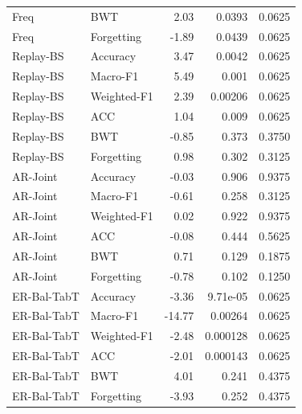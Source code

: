 \begin{table}[t]
\begin{tabular}{llrrr}
Freq & BWT & 2.03 & 0.0393 & 0.0625 \\
Freq & Forgetting & -1.89 & 0.0439 & 0.0625 \\
Replay-BS & Accuracy & 3.47 & 0.0042 & 0.0625 \\
Replay-BS & Macro-F1 & 5.49 & 0.001 & 0.0625 \\
Replay-BS & Weighted-F1 & 2.39 & 0.00206 & 0.0625 \\
Replay-BS & ACC & 1.04 & 0.009 & 0.0625 \\
Replay-BS & BWT & -0.85 & 0.373 & 0.3750 \\
Replay-BS & Forgetting & 0.98 & 0.302 & 0.3125 \\
AR-Joint & Accuracy & -0.03 & 0.906 & 0.9375 \\
AR-Joint & Macro-F1 & -0.61 & 0.258 & 0.3125 \\
AR-Joint & Weighted-F1 & 0.02 & 0.922 & 0.9375 \\
AR-Joint & ACC & -0.08 & 0.444 & 0.5625 \\
AR-Joint & BWT & 0.71 & 0.129 & 0.1875 \\
AR-Joint & Forgetting & -0.78 & 0.102 & 0.1250 \\
ER-Bal-TabT & Accuracy & -3.36 & 9.71e-05 & 0.0625 \\
ER-Bal-TabT & Macro-F1 & -14.77 & 0.00264 & 0.0625 \\
ER-Bal-TabT & Weighted-F1 & -2.48 & 0.000128 & 0.0625 \\
ER-Bal-TabT & ACC & -2.01 & 0.000143 & 0.0625 \\
ER-Bal-TabT & BWT & 4.01 & 0.241 & 0.4375 \\
ER-Bal-TabT & Forgetting & -3.93 & 0.252 & 0.4375 \\
\bottomrule\end{tabular}\end{table}
